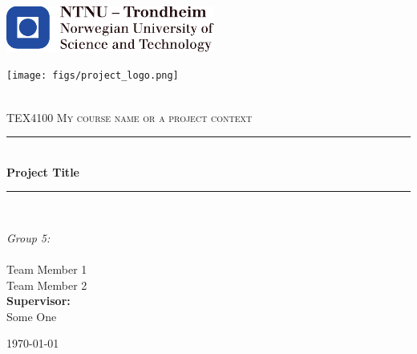 \begin{titlepage}
\centering

\begin{center}
    \includegraphics[height=1.5cm]{figs/ntnu_logo.pdf}\\[1cm] %
\end{center}

\begin{center}
    \texttt{[image: figs/project\_logo.png]}\\[1cm]
\end{center}

\begin{center}

\newcommand{\myauthor}{Team Member 1 \\ Team Member 2} 
\newcommand{\mytitle}{Project Title}
\newcommand{\mygroupnumber}{5} %

~\\[1.5cm]

\textsc{\Large TEX4100 My course name or a project context }\\[0.5cm]

\hrule ~\\[0.2cm]
{\huge \bfseries \mytitle}\\[0.5cm]		%
\hrule ~\\[1.5cm]



\begin{minipage}{0.4\textwidth}
    \centering
	\large
		\emph{Group \mygroupnumber:}\\~\\
		\myauthor\\
		\vspace{2.5cm}
		\vspace{1.5cm}
		\textbf{Supervisor:}  \\ Some One %
\end{minipage}

\vfill

{\large \today}

\end{center}
\end{titlepage}


\thispagestyle{empty}
